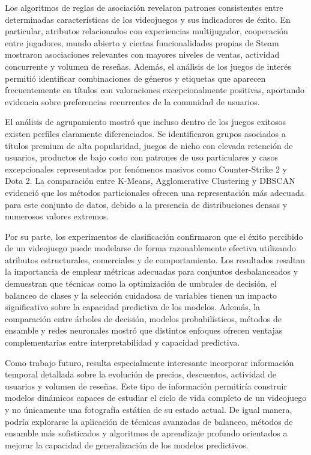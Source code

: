 \documentclass[conference]{IEEEtran}
\begin{document}
Los algoritmos de reglas de asociación revelaron patrones consistentes entre determinadas características de los videojuegos y sus indicadores de éxito. En particular, atributos relacionados con experiencias multijugador, cooperación entre jugadores, mundo abierto y ciertas funcionalidades propias de Steam mostraron asociaciones relevantes con mayores niveles de ventas, actividad concurrente y volumen de reseñas. Además, el análisis de los juegos de interés permitió identificar combinaciones de géneros y etiquetas que aparecen frecuentemente en títulos con valoraciones excepcionalmente positivas, aportando evidencia sobre preferencias recurrentes de la comunidad de usuarios.

El análisis de agrupamiento mostró que incluso dentro de los juegos exitosos existen perfiles claramente diferenciados. Se identificaron grupos asociados a títulos premium de alta popularidad, juegos de nicho con elevada retención de usuarios, productos de bajo costo con patrones de uso particulares y casos excepcionales representados por fenómenos masivos como Counter-Strike 2 y Dota 2. La comparación entre K-Means, Agglomerative Clustering y DBSCAN evidenció que los métodos particionales ofrecen una representación más adecuada para este conjunto de datos, debido a la presencia de distribuciones densas y numerosos valores extremos.

Por su parte, los experimentos de clasificación confirmaron que el éxito percibido de un videojuego puede modelarse de forma razonablemente efectiva utilizando atributos estructurales, comerciales y de comportamiento. Los resultados resaltan la importancia de emplear métricas adecuadas para conjuntos desbalanceados y demuestran que técnicas como la optimización de umbrales de decisión, el balanceo de clases y la selección cuidadosa de variables tienen un impacto significativo sobre la capacidad predictiva de los modelos. Además, la comparación entre árboles de decisión, modelos probabilísticos, métodos de ensamble y redes neuronales mostró que distintos enfoques ofrecen ventajas complementarias entre interpretabilidad y capacidad predictiva.

Como trabajo futuro, resulta especialmente interesante incorporar información temporal detallada sobre la evolución de precios, descuentos, actividad de usuarios y volumen de reseñas. Este tipo de información permitiría construir modelos dinámicos capaces de estudiar el ciclo de vida completo de un videojuego y no únicamente una fotografía estática de su estado actual. De igual manera, podría explorarse la aplicación de técnicas avanzadas de balanceo, métodos de ensamble más sofisticados y algoritmos de aprendizaje profundo orientados a mejorar la capacidad de generalización de los modelos predictivos.
\end{document}
